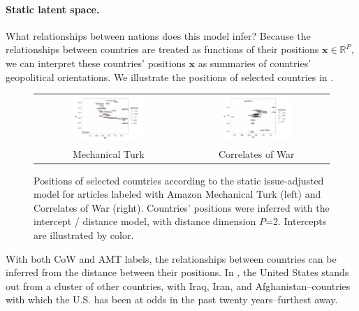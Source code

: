 \paragraph{Static latent space.}
What relationships between nations does this model infer?  Because the
relationships between countries are treated as functions of their
positions $\bm x \in \mathbb{R}^P$, we can interpret these countries'
positions $\bm x$ as summaries of countries' geopolitical
orientations.  We illustrate the positions of selected countries in
.

\begin{figure}
  \begin{tabular}{cc}
    \includegraphics[width=0.5\textwidth]{chapter_foreign_relations/figures/011_static_positions_mturk.pdf} &
    \includegraphics[width=0.5\textwidth]{chapter_foreign_relations/figures/011_static_positions_cow.pdf}
    \\
    Mechanical Turk & Correlates of War \\
  \end{tabular}
  \caption{Positions of selected countries according to the static
    issue-adjusted model for articles labeled with Amazon Mechanical
    Turk (left) and Correlates of War (right).  Countries' positions
    were inferred with the intercept / distance model, with distance
    dimension $P$=2.  Intercepts are illustrated by color.}
  \label{fig:fr_intercept_distance_positions}
\end{figure}

With both CoW and AMT labels, the relationships between
countries can be inferred from the distance between their positions.
In , the United States stands
out from a cluster of other countries, with Iraq, Iran, and
Afghanistan--countries with which the U.S. has been at odds in the past
twenty years--furthest away.

